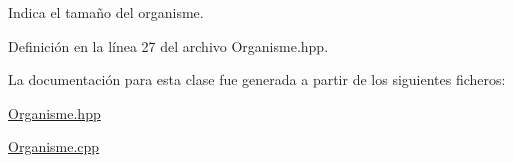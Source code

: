 Indica el tamaño del organisme. 



Definición en la línea 27 del archivo Organisme.\-hpp.



La documentación para esta clase fue generada a partir de los siguientes ficheros\-:\begin{DoxyCompactItemize}
\item 
\hyperlink{_organisme_8hpp}{Organisme.\-hpp}\item 
\hyperlink{_organisme_8cpp}{Organisme.\-cpp}\end{DoxyCompactItemize}
